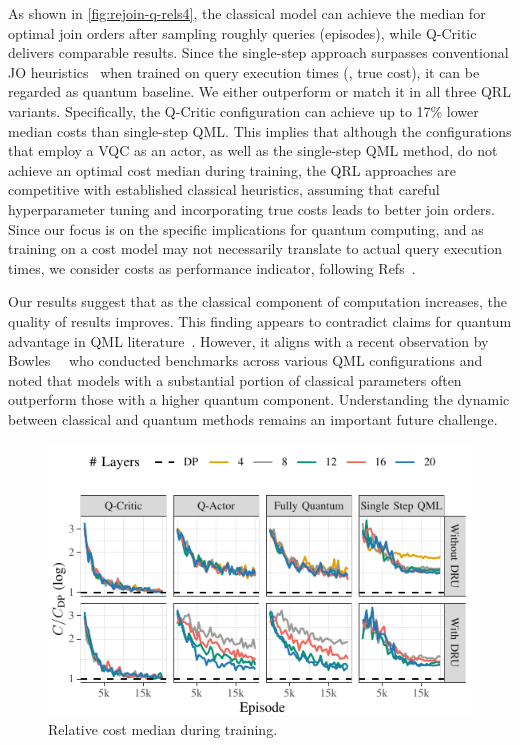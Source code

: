 \documentclass[10pt, conference]{IEEEtran}
\begin{document}
As shown in \autoref{fig:rejoin-q-rels4}, the classical model can achieve the median for optimal join orders after sampling roughly  queries (episodes), while Q-Critic delivers comparable results.
Since the single-step approach surpasses conventional JO heuristics~\cite{winker23, calikyilmaz23} when trained on query execution times (\ie, true cost), it can be
regarded as quantum baseline.  We either outperform or match it in all three QRL variants.
Specifically, the Q-Critic configuration can achieve up to 17\% lower median costs than single-step QML.
This implies that although the configurations that employ a VQC as an actor, as well as the single-step QML method, do not achieve an optimal cost median during training, the QRL approaches are competitive with established classical heuristics, assuming that careful hyperparameter tuning and incorporating true costs leads to better join orders.
Since our focus is on the specific implications for quantum computing, and as training on a cost model may not necessarily translate to actual query execution times, we consider costs as performance indicator, following Refs~\cite{marcus18, krishnan18, xiang20}.

Our results suggest that as the classical component of computation increases, the quality of results improves.
This finding appears to contradict claims for quantum advantage in QML literature~\cite{havl19, huang21, liu21}.
However, it aligns with a recent observation by Bowles~\etal~\cite{bowles24} who conducted benchmarks across various QML configurations and noted that models with a substantial portion of classical parameters often outperform those with a higher quantum component.
Understanding the dynamic between classical and quantum methods remains an important future challenge.

\begin{figure}[htbp]
  \includegraphics{img-gen/convergence_rejoin_q_layers.pdf}\vspace*{-0.5em}
  \caption{Relative cost median during training.}
  \label{fig:rejoin-q-rels4-layers}
\end{figure}
\end{document}
